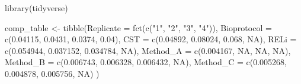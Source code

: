 \documentclass[
  letterpaper,
  DIV=11,
  numbers=noendperiod]{scrreprt}
\newenvironment{Shaded}{\begin{snugshade}}{\end{snugshade}}
\newcommand{\AttributeTok}[1]{\textcolor[rgb]{0.40,0.45,0.13}{#1}}
\newcommand{\ConstantTok}[1]{\textcolor[rgb]{0.56,0.35,0.01}{#1}}
\newcommand{\FloatTok}[1]{\textcolor[rgb]{0.68,0.00,0.00}{#1}}
\newcommand{\FunctionTok}[1]{\textcolor[rgb]{0.28,0.35,0.67}{#1}}
\newcommand{\NormalTok}[1]{\textcolor[rgb]{0.00,0.23,0.31}{#1}}
\newcommand{\OtherTok}[1]{\textcolor[rgb]{0.00,0.23,0.31}{#1}}
\newcommand{\StringTok}[1]{\textcolor[rgb]{0.13,0.47,0.30}{#1}}
\begin{document}
\begin{Shaded}
\begin{Highlighting}[]
\FunctionTok{library}\NormalTok{(tidyverse)}

\NormalTok{comp\_table }\OtherTok{\textless{}{-}} \FunctionTok{tibble}\NormalTok{(}\AttributeTok{Replicate =} \FunctionTok{fct}\NormalTok{(}\FunctionTok{c}\NormalTok{(}\StringTok{"1"}\NormalTok{, }\StringTok{"2"}\NormalTok{, }\StringTok{"3"}\NormalTok{, }\StringTok{"4"}\NormalTok{)),}
       \AttributeTok{Bioprotocol =} \FunctionTok{c}\NormalTok{(}\FloatTok{0.04115}\NormalTok{, }\FloatTok{0.0431}\NormalTok{, }\FloatTok{0.0374}\NormalTok{, }\FloatTok{0.04}\NormalTok{),}
       \AttributeTok{CST =} \FunctionTok{c}\NormalTok{(}\FloatTok{0.04892}\NormalTok{, }\FloatTok{0.08024}\NormalTok{, }\FloatTok{0.068}\NormalTok{, }\ConstantTok{NA}\NormalTok{),}
       \AttributeTok{RELi =} \FunctionTok{c}\NormalTok{(}\FloatTok{0.054944}\NormalTok{, }\FloatTok{0.037152}\NormalTok{, }\FloatTok{0.034784}\NormalTok{, }\ConstantTok{NA}\NormalTok{),}
       \AttributeTok{Method\_A =} \FunctionTok{c}\NormalTok{(}\FloatTok{0.004167}\NormalTok{, }\ConstantTok{NA}\NormalTok{, }\ConstantTok{NA}\NormalTok{, }\ConstantTok{NA}\NormalTok{),}
       \AttributeTok{Method\_B =} \FunctionTok{c}\NormalTok{(}\FloatTok{0.006743}\NormalTok{, }\FloatTok{0.006328}\NormalTok{, }\FloatTok{0.006432}\NormalTok{, }\ConstantTok{NA}\NormalTok{),}
       \AttributeTok{Method\_C =} \FunctionTok{c}\NormalTok{(}\FloatTok{0.005268}\NormalTok{, }\FloatTok{0.004878}\NormalTok{, }\FloatTok{0.005756}\NormalTok{, }\ConstantTok{NA}\NormalTok{)}
\NormalTok{       )}


\end{Highlighting}
\end{Shaded}
\end{document}
